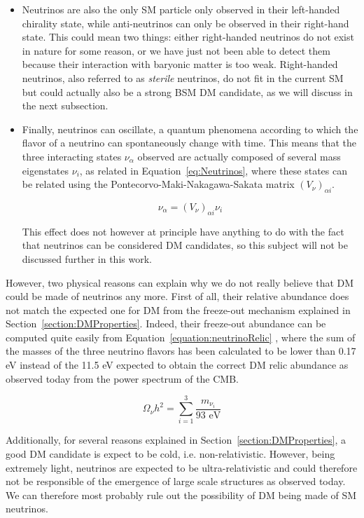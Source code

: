 \documentclass[a4paper, 10pt, openright]{report}
\begin{document}
\begin{itemize}
\item Neutrinos are also the only \ac{SM} particle only observed in their left-handed chirality state, while anti-neutrinos can only be observed in their right-hand state. This could mean two things: either right-handed neutrinos do not exist in nature for some reason, or we have just not been able to detect them because their interaction with baryonic matter is too weak. Right-handed neutrinos, also referred to as \textit{sterile} neutrinos, do not fit in the current \ac{SM} but could actually also be a strong \ac{BSM} \ac{DM} candidate, as we will discuss in the next subsection.
\item Finally, neutrinos can oscillate, a quantum phenomena according to which the flavor of a neutrino can spontaneously change with time. This means that the three interacting states $\nu_\alpha$ observed are actually composed of several mass eigenstates $\nu_i$, as related in Equation~\ref{eq:Neutrinos}, where these states can be related using the Pontecorvo-Maki-Nakagawa-Sakata matrix $(V_\nu)_{\alpha i}$.

\begin{equation}
\label{eq:Neutrinos}
\nu_\alpha = (V_\nu)_{\alpha i} \nu_i
\end{equation}

This effect does not however at principle have anything to do with the fact that neutrinos can be considered \ac{DM} candidates, so this subject will not be discussed further in this work.
\end{itemize}

However, two physical reasons can explain why we do not really believe that \ac{DM} could be made of neutrinos any more. First of all, their relative abundance does not match the expected one for \ac{DM} from the freeze-out mechanism explained in Section~\ref{section:DMProperties}. Indeed, their freeze-out abundance can be computed quite easily from Equation~\ref{equation:neutrinoRelic} \cite{WIMPBook}, where the sum of the masses of the three neutrino flavors has been calculated to be lower than 0.17 eV \cite{NeutrinoMass} instead of the 11.5 eV expected to obtain the correct \ac{DM} relic abundance as observed today from the power spectrum of the \ac{CMB}. 

\begin{equation}
\label{equation:neutrinoRelic}
\Omega_\nu h^2 = \sum_{i=1}^3 \frac{m_{\nu_i}}{93 \text{ eV}}
\end{equation}

Additionally, for several reasons explained in Section~\ref{section:DMProperties}, a good \ac{DM} candidate is expect to be cold, i.e. non-relativistic. However, being extremely light, neutrinos are expected to be ultra-relativistic and could therefore not be responsible of the emergence of large scale structures as observed today. We can therefore most probably rule out the possibility of \ac{DM} being made of \ac{SM} neutrinos.
\end{document}

